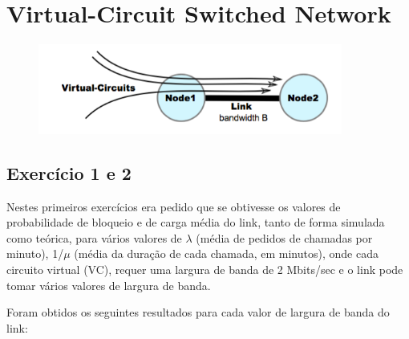 \documentclass[pdftex,12pt,a4paper]{report}
\begin{document}
\renewcommand{\headrulewidth}{0pt}

\fancyhead{}
\fancyfoot{}
\rfoot{\thepage}

\renewcommand*\contentsname{Conteúdos}
\renewcommand*\figurename{Figura}
\renewcommand*\tablename{Tabela}

\tableofcontents
\renewcommand{\headrulewidth}{0.15pt}
\renewcommand{\thechapter}{}

\clearpage

\section{Virtual-Circuit Switched Network}

\begin{figure}[!htb]
\center
 \includegraphics[width=100mm,scale=1]{imagensGuia/ex1.png}
 \label{fig:ex1}
\end{figure}

\subsection{Exercício 1 e 2}

Nestes primeiros exercícios era pedido que se obtivesse os valores de probabilidade de bloqueio e de carga média do link, tanto de forma simulada como teórica, para vários valores de $\lambda$ (média de pedidos de chamadas por minuto), 1/$\mu$ (média da duração de cada chamada, em minutos), onde cada circuito virtual (VC), requer uma largura de banda de 2 Mbits/sec e o link pode tomar vários valores de largura de banda.


Foram obtidos os seguintes resultados para cada valor de largura de banda do link:
\end{document}
